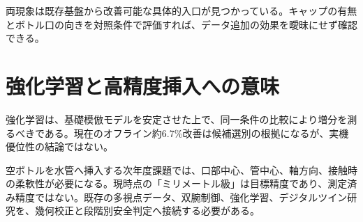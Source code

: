 両現象は既存基盤から改善可能な具体的入口が見つかっている。キャップの有無とボトル口の向きを対照条件で評価すれば、データ追加の効果を曖昧にせず確認できる。

\section{強化学習と高精度挿入への意味}

強化学習は、基礎模倣モデルを安定させた上で、同一条件の比較により増分を測るべきである。現在のオフライン約6.7\%改善は候補選別の根拠になるが、実機優位性の結論ではない。

空ボトルを水管へ挿入する次年度課題では、口部中心、管中心、軸方向、接触時の柔軟性が必要になる。現時点の「ミリメートル級」は目標精度であり、測定済み精度ではない。既存の多視点データ、双腕制御、強化学習、デジタルツイン研究を、幾何校正と段階別安全判定へ接続する必要がある。
